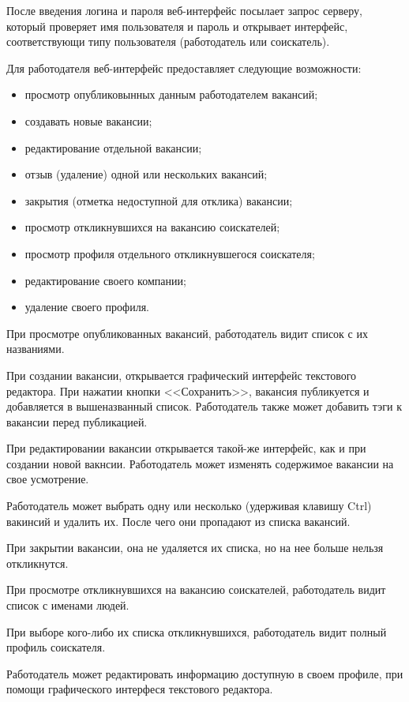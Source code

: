 \documentclass[a4page]{article}
\begin{document}
После введения логина и пароля веб-интерфейс посылает запрос серверу, который проверяет имя пользователя и пароль и открывает интерфейс, соответствующи типу пользователя (работодатель или соискатель).

Для работодателя веб-интерфейс предоставляет следующие возможности:

\begin{itemize}
  \item просмотр опубликовынных данным работодателем вакансий;
  \item создавать новые вакансии;
  \item редактирование отдельной вакансии;
  \item отзыв (удаление) одной или нескольких вакансий;
  \item закрытия (отметка недоступной для отклика) вакансии;
  \item просмотр откликнувшихся на вакансию соискателей;
  \item просмотр профиля отдельного откликнувшегося соискателя;
  \item редактирование своего компании;
  \item удаление своего профиля.
\end{itemize}

При просмотре опубликованных вакансий, работодатель видит список с их названиями.

При создании вакансии, открывается графический интерфейс текстового редактора. При нажатии кнопки <<Сохранить>>, вакансия публикуется и добавляется в вышеназванный список. Работодатель также может добавить тэги к вакансии перед публикацией.

При редактировании вакансии открывается такой-же интерфейс, как и при создании новой вакнсии. Работодатель может изменять содержимое вакансии на свое усмотрение.

Работодатель может выбрать одну или несколько (удерживая клавишу Ctrl) вакинсий и удалить их. После чего они пропадают из списка вакансий.

При закрытии вакансии, она не удаляется их списка, но на нее больше нельзя откликнутся.

При просмотре откликнувшихся на вакансию соискателей, работодатель видит список с именами людей.

При выборе кого-либо их списка откликнувшихся, работодатель видит полный профиль соискателя.

Работодатель может редактировать информацию доступную в своем профиле, при помощи графического интерфеся текстового редактора.
\end{document}
